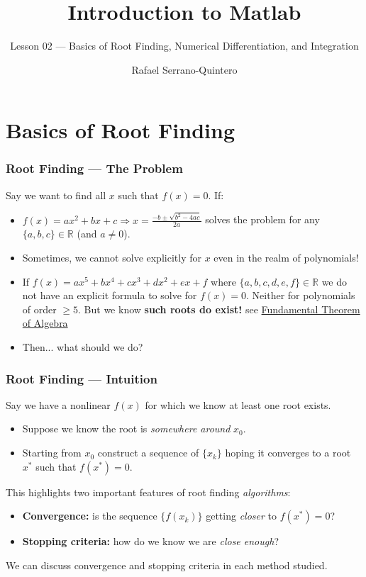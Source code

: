 \documentclass[11pt,xcolor={svgnames},aspectratio=169,usepdftitle=false,notheorems]{beamer}
\title{Introduction to Matlab}
\subtitle{Lesson 02 --- Basics of Root Finding, Numerical Differentiation, and Integration}
\author{Rafael Serrano-Quintero}
\institute{Department of Economics \\ University of Barcelona}
\date{}
\begin{document}
\VerbatimFootnotes

\maketitle

\section{Basics of Root Finding}

\begin{frame}
  \frametitle{Root Finding --- The Problem}
Say we want to find all $x$ such that $f(x) = 0$. If:
\begin{itemize}
  \item $f(x) = ax^2 + bx + c \Rightarrow x = \frac{-b \pm \sqrt{b^2 - 4ac}}{2a}$ solves the problem for any $\{a,b,c\}\in\mathbb{R}$ {\tiny (and $a\neq 0$)}.
  \item Sometimes, we cannot solve explicitly for $x$ even in the realm of polynomials!
  \item If $f(x) = ax^5 + bx^4 + cx^3 + dx^2 + ex + f$ where $\{a,b,c,d,e,f\}\in\mathbb{R}$ we do not have an explicit formula to solve for $f(x) = 0$. Neither for polynomials of order $\geq 5$. But we know \alert{\textbf{such roots do exist!}} {\tiny see \href{https://en.wikipedia.org/wiki/Fundamental_theorem_of_algebra}{Fundamental Theorem of Algebra}}
  \item Then... what should we do?
\end{itemize}
\end{frame}

\begin{frame}
  \frametitle{Root Finding --- Intuition}
Say we have a nonlinear $f(x)$ for which we know at least one root exists.
\begin{itemize}
  \item Suppose we know the root is \textit{somewhere around} $x_0$.
  \item Starting from $x_0$ construct a sequence of $\{x_k\}$ hoping it converges to a root $x^*$ such that $f(x^*) = 0$.
\end{itemize}
This highlights two important features of root finding \textit{algorithms}:
\begin{itemize}
  \item \alert{\textbf{Convergence:}} is the sequence $\{f(x_k)\}$ getting \textit{closer} to $f(x^*) = 0$?
  \item \alert{\textbf{Stopping criteria:}} how do we know we are \textit{close enough}?
\end{itemize}
We can discuss convergence and stopping criteria in each method studied.
\end{frame}
\end{document}
